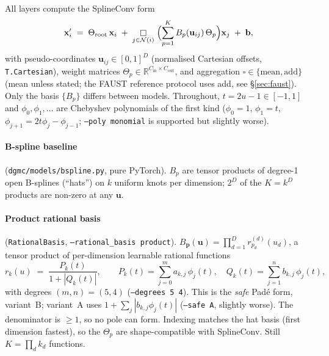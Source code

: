 \documentclass[11pt]{article}
\newcommand{\bx}{\mathbf{x}}
\newcommand{\bu}{\mathbf{u}}
\newcommand{\R}{\mathbb{R}}
\newcommand{\Cin}{C_{\mathrm{in}}}
\newcommand{\Cout}{C_{\mathrm{out}}}
\newcommand{\code}[1]{\texttt{#1}}
\begin{document}
All layers compute the SplineConv form
\begin{equation}
\bx'_i \;=\; \Theta_{\mathrm{root}}\,\bx_i \;+\;
\mathop{\square}_{j\in\mathcal N(i)}\;\Bigl(\sum_{p=1}^{K} B_p(\bu_{ij})\,\Theta_p\Bigr)\bx_j \;+\; \mathbf b,
\label{eq:splineconv}
\end{equation}
with pseudo-coordinates $\bu_{ij}\in[0,1]^D$ (normalised Cartesian offsets,
\code{T.Cartesian}), weight matrices $\Theta_p\in\R^{\Cin\times\Cout}$, and
aggregation $\square \in \{\mathrm{mean}, \mathrm{add}\}$ (mean unless stated;
the FAUST reference protocol uses add, see \S\ref{sec:faust}). Only the basis
$\{B_p\}$ differs between models. Throughout, $t = 2u-1 \in [-1,1]$ and
$\phi_0,\phi_1,\dots$ are Chebyshev polynomials of the first kind
($\phi_0{=}1$, $\phi_1{=}t$, $\phi_{j+1}{=}2t\phi_j-\phi_{j-1}$;
\code{--poly monomial} is supported but slightly worse).

\paragraph{B-spline baseline} (\code{dgmc/models/bspline.py}, pure PyTorch).
$B_p$ are tensor products of degree-1 open B-splines (``hats'') on $k$
uniform knots per dimension; $2^D$ of the $K=k^D$ products are non-zero at
any $\bu$.

\paragraph{Product rational basis} (\code{RationalBasis},
\code{--rational\_basis product}).
$B_{\mathbf p}(\bu) = \prod_{d=1}^{D} r^{(d)}_{p_d}(u_d)$, a tensor product of
per-dimension learnable rational functions
\begin{equation}
r_k(u) \;=\; \frac{P_k(t)}{1+|Q_k(t)|}, \qquad
P_k(t)=\sum_{j=0}^{m} a_{k,j}\,\phi_j(t), \quad
Q_k(t)=\sum_{j=1}^{n} b_{k,j}\,\phi_j(t),
\label{eq:safepade}
\end{equation}
with degrees $(m,n)=(5,4)$ (\code{--degrees 5 4}). This is the \emph{safe}
Pad\'e form, variant~B; variant~A uses $1+\sum_j |b_{k,j}\phi_j(t)|$
(\code{--safe A}, slightly worse). The denominator is $\ge 1$, so no pole can
form. Indexing matches the hat basis (first dimension fastest), so the
$\Theta_p$ are shape-compatible with SplineConv. Still $K=\prod_d k_d$
functions.
\end{document}
